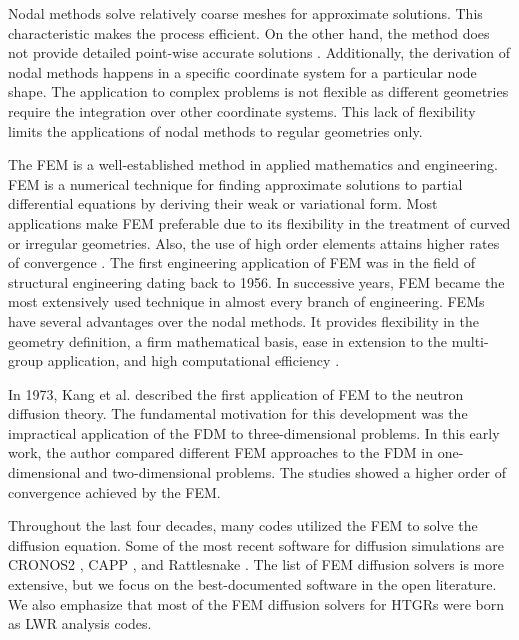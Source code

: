 Nodal methods solve relatively coarse meshes for approximate solutions.
This characteristic makes the process efficient.
On the other hand, the method does not provide detailed point-wise accurate solutions \cite{kang_finite_1973}.
Additionally, the derivation of nodal methods happens in a specific coordinate system for a particular node shape.
The application to complex problems is not flexible as different geometries require the integration over other coordinate systems.
This lack of flexibility limits the applications of nodal methods to regular geometries only.

The \gls{FEM} is a well-established method in applied mathematics and engineering.
\gls{FEM} is a numerical technique for finding approximate solutions to partial differential equations by deriving their weak or variational form.
Most applications make \gls{FEM} preferable due to its flexibility in the treatment of curved or irregular geometries.
Also, the use of high order elements attains higher rates of convergence \cite{cavdar_finite_2004}.
The first engineering application of \gls{FEM} was in the field of structural engineering dating back to 1956.
In successive years, \gls{FEM} became the most extensively used technique in almost every branch of engineering.
\glspl{FEM} have several advantages over the nodal methods.
It provides flexibility in the geometry definition, a firm mathematical basis, ease in extension to the multi-group application, and high computational efficiency \cite{lee_development_2008}.

In 1973, Kang et al. \cite{kang_finite_1973} described the first application of \gls{FEM} to the neutron diffusion theory.
The fundamental motivation for this development was the impractical application of the \gls{FDM} to three-dimensional problems.
In this early work, the author compared different \gls{FEM} approaches to the \gls{FDM} in one-dimensional and two-dimensional problems.
The studies showed a higher order of convergence achieved by the \gls{FEM}.

Throughout the last four decades, many codes utilized the \gls{FEM} to solve the diffusion equation.
Some of the most recent software for diffusion simulations are CRONOS2 \cite{lautard_cronos_1990}, CAPP \cite{lee_development_2011}, and Rattlesnake \cite{wang_rattlesnake_2019}.
The list of \gls{FEM} diffusion solvers is more extensive, but we focus on the best-documented software in the open literature.
We also emphasize that most of the \gls{FEM} diffusion solvers for \glspl{HTGR} were born as \gls{LWR} analysis codes.

